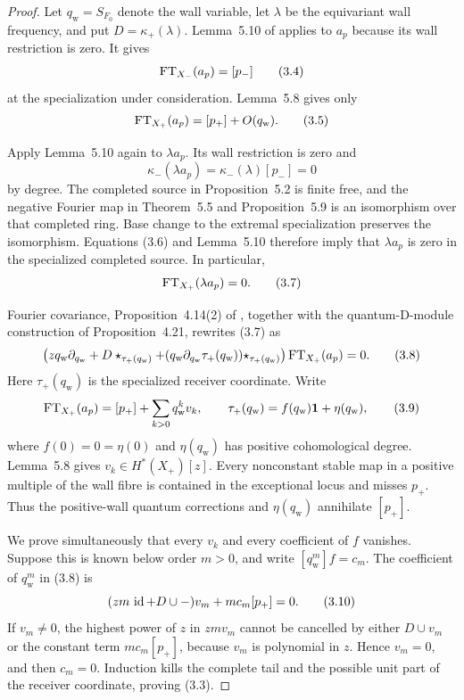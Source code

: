 \begin{proof}
Let \(q_{\mathrm w}=S_{F_0}\) denote the wall variable, let \(\lambda\) be the
equivariant wall frequency, and put \(D=\kappa_+(\lambda)\).
Lemma~5.10 of \cite{GuYuYu} applies to \(a_p\) because its wall
restriction is zero.  It gives
\[
 \operatorname{FT}_{X_-}(a_p)=[p_-]                                     \tag{3.4}
\]
at the specialization under consideration.  Lemma~5.8 gives only
\[
 \operatorname{FT}_{X_+}(a_p)=[p_+]+O(q_{\mathrm w}).                    \tag{3.5}
\]

Apply Lemma~5.10 again to \(\lambda a_p\).  Its wall restriction is zero and
\[
 \kappa_-(\lambda a_p)=\kappa_-(\lambda)[p_-]=0           \tag{3.6}
\]
by degree.  The completed source in Proposition~5.2 is finite free, and the
negative Fourier map in Theorem~5.5 and Proposition~5.9 is an isomorphism
over that completed ring.  Base change to the extremal specialization
preserves the isomorphism.  Equations (3.6) and Lemma~5.10 therefore imply
that \(\lambda a_p\) is zero in the specialized completed source.  In
particular,
\[
 \operatorname{FT}_{X_+}(\lambda a_p)=0.                                 \tag{3.7}
\]

Fourier covariance, Proposition~4.14(2) of \cite{GuYuYu}, together with the
quantum-D-module construction of Proposition~4.21, rewrites (3.7) as
\[
 \bigl(zq_{\mathrm w}\partial_{q_{\mathrm w}}+D\star_{\tau_+(q_{\mathrm w})}
 +(q_{\mathrm w}\partial_{q_{\mathrm w}}\tau_+(q_{\mathrm w}))
   \star_{\tau_+(q_{\mathrm w})}\bigr)
 \operatorname{FT}_{X_+}(a_p)=0.                                        \tag{3.8}
\]
Here \(\tau_+(q_{\mathrm w})\) is the specialized receiver coordinate.  Write
\[
 \operatorname{FT}_{X_+}(a_p)=[p_+]+\sum_{k>0}q_{\mathrm w}^kv_k,
 \qquad
 \tau_+(q_{\mathrm w})=f(q_{\mathrm w})\mathbf1+\eta(q_{\mathrm w}),
                                                               \tag{3.9}
\]
where \(f(0)=0=\eta(0)\) and \(\eta(q_{\mathrm w})\) has positive
cohomological degree.
Lemma~5.8 gives \(v_k\in H^*(X_+)[z]\).  Every nonconstant stable map in a
positive multiple of the wall fibre is contained in the exceptional locus
and misses \(p_+\).  Thus the positive-wall quantum corrections and
\(\eta(q_{\mathrm w})\) annihilate \([p_+]\).

We prove simultaneously that every \(v_k\) and every coefficient of \(f\)
vanishes.  Suppose this is known below order \(m>0\), and write
\([q_{\mathrm w}^m]f=c_m\).  The coefficient of \(q_{\mathrm w}^m\) in (3.8) is
\[
 (zm\,\operatorname{id}+D\cup-)v_m+mc_m[p_+]=0.                           \tag{3.10}
\]
If \(v_m\ne0\), the highest power of \(z\) in \(zmv_m\) cannot be cancelled
by either \(D\cup v_m\) or the constant term \(mc_m[p_+]\), because \(v_m\)
is polynomial in \(z\).  Hence \(v_m=0\), and then \(c_m=0\).  Induction
kills the complete tail and the possible unit part of the receiver
coordinate, proving (3.3).
\end{proof}

